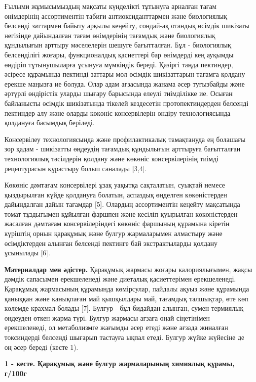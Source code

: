 Ғылыми жұмысымыздың мақсаты күнделікті тұтынуға арналған тағам
өнімдерінің ассортиментін табиғи антиоксиданттармен және биологиялық
белсенді заттармен байыту арқылы кеңейту, сондай-ақ отандық өсімдік
шикізаты негізінде дайындалған тағам өнімдерінің тағамдық және
биологиялық құндылығын арттыру мәселелерін шешуге бағытталған. Бұл -
биологиялық белсенділігі жоғары, функционалдық қасиеттері бар өнімдерді
кең ауқымды өндіріп тұтынушыларға ұсынуға мүмкіндік береді. Қазіргі
таңда пектиндер, әсіресе құрамында пектинді заттары мол өсімдік
шикізаттарын тағамға қолдану ерекше маңызға ие болуда. Олар адам
ағзасында жанама әсер туғызбайды және әртүрлі өндірістік уларды шығару
барысында елеулі тиімділікке ие. Осыған байланысты өсімдік шикізатында
тікелей кездесетін протопектиндерден белсенді пектиндер алу және оларды
көкөніс консервілерін өндіру технологиясында қолдануға басымдық
беріледі.

Консервілеу технологиясында және профилактикалық тамақтануда ең болашағы
зор қадам - шикізатты өңдеудің тағамдық құндылығын арттыруға бағытталған
технологиялық тәсілдерін қолдану және көкөніс консервілерінің тиімді
рецептурасын құрастыру болып саналады {[}3,4{]}.

Көкөніс дәмтағам консервілері ұзақ уақытқа сақталатын, суықтай немесе
қыздырылған күйде қолдануға болатын, аспаздық өңделген көкөністерден
дайындалған дайын тағамдар {[}5{]}. Олардың ассортиментін кеңейту
мақсатында томат тұздығымен құйылған фаршпен және кесіліп қуырылған
көкөністерден жасалған дәмтағам консервілеріндегі көкөніс фаршының
құрамына кіретін күріштің орнын қарақұмық және булгур жармаларымен
алмастыру және өсімдіктерден алынған белсенді пектинге бай
экстрактыларды қолдану ұсынылады {[}6{]}.

{\bfseries Материалдар мен әдістер.} Қарақұмық жармасы жоғары
калориялығымен, жақсы дәмдік сапасымен ерекшеленеді және диеталық
қасиеттерімен ерекшеленеді. Қарақұмық жармасының құрамында көмірсулар,
пайдалы ақуыз және құрамында қаныққан және қанықпаған май қышқылдары
май, тағамдық талшықтар, өте көп көлемде крахмал болады {[}7{]}. Булгур
- бұл бидайдан алынған, сумен термиялық өңдеуден өткен жарма түрі.
Булгур жармасы ағзаға оңай сіңетінімен ерекшеленеді, ол метаболизмге
жағымды әсер етеді және ағзада жиналған токсиндерді белсенді шығарып
тастауға ықпал етеді. Булгур жүйке жүйесіне де оң әсер береді (кесте 1).

{\bfseries 1 - кесте. Қарақұмық және булгур жармаларының химиялық құрамы,
г/100г}

